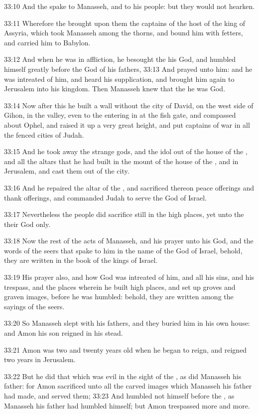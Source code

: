 33:10 And the \LORD spake to Manasseh, and to his people: but they would not hearken.

33:11 Wherefore the \LORD brought upon them the captains of the host of the king of Assyria, which took Manasseh among the thorns, and bound him with fetters, and carried him to Babylon.

33:12 And when he was in affliction, he besought the \LORD his God, and humbled himself greatly before the God of his fathers, 33:13 And prayed unto him: and he was intreated of him, and heard his supplication, and brought him again to Jerusalem into his kingdom.  Then Manasseh knew that the \LORD he was God.

33:14 Now after this he built a wall without the city of David, on the west side of Gihon, in the valley, even to the entering in at the fish gate, and compassed about Ophel, and raised it up a very great height, and put captains of war in all the fenced cities of Judah.

33:15 And he took away the strange gods, and the idol out of the house of the \LORD, and all the altars that he had built in the mount of the house of the \LORD, and in Jerusalem, and cast them out of the city.

33:16 And he repaired the altar of the \LORD, and sacrificed thereon peace offerings and thank offerings, and commanded Judah to serve the \LORD God of Israel.

33:17 Nevertheless the people did sacrifice still in the high places, yet unto the \LORD their God only.

33:18 Now the rest of the acts of Manasseh, and his prayer unto his God, and the words of the seers that spake to him in the name of the \LORD God of Israel, behold, they are written in the book of the kings of Israel.

33:19 His prayer also, and how God was intreated of him, and all his sins, and his trespass, and the places wherein he built high places, and set up groves and graven images, before he was humbled: behold, they are written among the sayings of the seers.

33:20 So Manasseh slept with his fathers, and they buried him in his own house: and Amon his son reigned in his stead.

33:21 Amon was two and twenty years old when he began to reign, and reigned two years in Jerusalem.

33:22 But he did that which was evil in the sight of the \LORD, as did Manasseh his father: for Amon sacrificed unto all the carved images which Manasseh his father had made, and served them; 33:23 And humbled not himself before the \LORD, as Manasseh his father had humbled himself; but Amon trespassed more and more.

